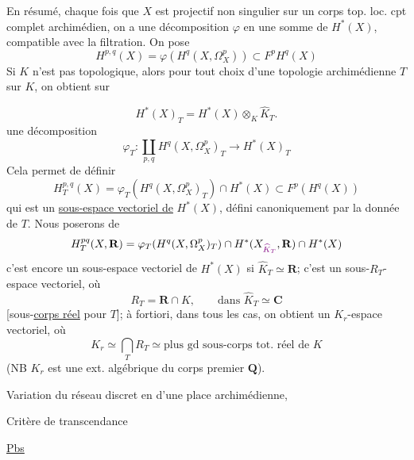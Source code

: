 En résumé, chaque fois que $X$ est projectif non singulier sur un corps  top. loc. cpt complet archimédien, on a une décomposition $\varphi$ en une somme de $H^*(X)$, compatible avec la filtration.  On pose
\[
 \boxed{H^{p,q}(X)=\varphi(H^q(X,\Omega_X^p))\subset F^pH^q(X)}
\]
Si $K$ n'est pas topologique, alors pour tout choix d'une topologie  archimédienne $T$ sur $K$, on obtient sur

\[
 H^*(X)_T=H^*(X)\otimes_K\widehat K_T.
\]
une décomposition
\[
 \boxed{\varphi_T:\coprod_{p,q}H^q(X,\Omega_X^p)_T\longrightarrow H^*(X)_T}
\]
Cela permet de définir
\[
 H_T^{p,q}(X)=\varphi_T(H^q(X,\Omega_X^p)_T)\cap H^*(X)\subset F^p(H^q(X))
\]
qui est un \uline{sous-espace vectoriel de} $H^*(X)$, défini canoniquement par la donnée de $T$. Nous poserons de \unsure{$=$}
\[
 H_T^{pq}(X,\mathbf R)=\varphi_T(H^q(X,\Omega_X^p)_T)\cap H^*(X_{\unsure{\widehat K_T}},\mathbf R)\cap H^*(X)
\]
c'est encore un sous-espace vectoriel de $H^*(X)$ si $\widehat K_T\simeq\mathbf R$;   c'est un sous-$R_T$-espace vectoriel, où
\[
 R_T=\mathbf R\cap K,\qquad\text{dans }\widehat K_T\simeq\mathbf C
\]
[sous-\uline{corps réel} pour $T$]; à fortiori,  dans tous les cas, on obtient un $K_r$-espace vectoriel, où
\[
 K_r\simeq\bigcap_T R_T\simeq\text{plus gd sous-corps tot. réel de }K
\]
(NB $K_r$ est une ext. algébrique du corps premier $\mathbf Q$).

Variation du réseau discret en  d'une place archimédienne,

Critère de transcendance

\uline{Pbs}



